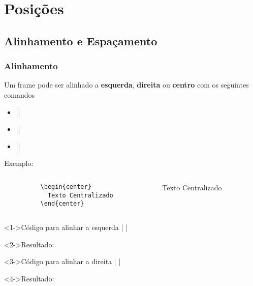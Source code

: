 \section{Posições}
\subsection{Alinhamento e Espaçamento}

\begin{frame}[fragile]
  \frametitle{Alinhamento}

  Um frame pode ser alinhado a \textbf{esquerda}, \textbf{direita} ou \textbf{centro} com os
  seguintes comandos
  \begin{itemize}
     \item {}||
     \item {}||
     \item {}||
  \end{itemize}

  \begin{block}{Exemplo:}
    \begin{columns}
      \begin{column}[l]{5cm}
        \begin{verbatim}
          \begin{center}
            Texto Centralizado
          \end{center}
        \end{verbatim}
      \end{column}

      \begin{column}[r]{5cm}
          \begin{center}
            Texto Centralizado
          \end{center}
      \end{column}
    \end{columns}
  \end{block}

\end{frame}

\begin{frame}[fragile]

  \begin{block}<1->{Código para alinhar a esquerda}
    |  |
  \end{block}

  \begin{block}<2->{Resultado:}
   \end{block}

  \begin{block}<3->{Código para alinhar a direita}
    |  |
  \end{block}

  \begin{block}<4->{Resultado:}
  \end{block}

\end{frame}

